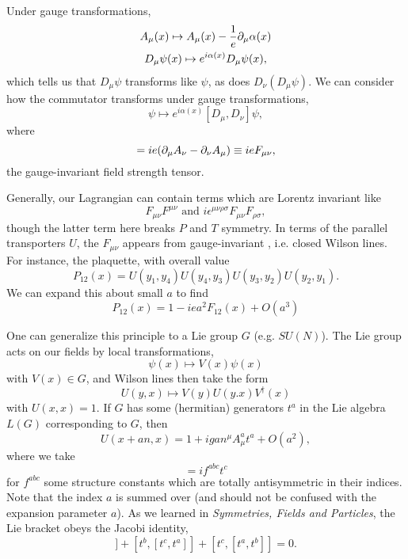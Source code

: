 Under gauge transformations,
\begin{gather}
    A_\mu(x) \mapsto A_\mu(x) -\frac{1}{e} \partial_\mu \alpha(x)\\
    D_\mu \psi(x) \mapsto e^{i\alpha(x)}D_\mu \psi(x),
\end{gather}
which tells us that $D_\mu \psi$ transforms like $\psi$, as does $D_\nu (D_\mu \psi)$. We can consider how the commutator transforms under gauge transformations,
\begin{equation}
    [D_\mu,D_\nu]\psi \mapsto e^{i\alpha(x)} [D_\mu,D_\nu] \psi,
\end{equation}
where
\begin{equation}
    [D_\mu,D_\nu]=ie(\p_\mu A_\nu - \p_\nu A_\mu)\equiv ie F_{\mu\nu},
\end{equation}
the gauge-invariant field strength tensor.

Generally, our Lagrangian can contain terms which are Lorentz invariant like
\begin{equation}
    F_{\mu\nu} F^{\mu\nu}\text{ and } i\epsilon^{\mu\nu\rho\sigma} F_{\mu\nu} F_{\rho\sigma},
\end{equation}
though the latter term here breaks $P$ and $T$ symmetry. In terms of the parallel transporters $U$, the $F_{\mu\nu}$ appears from gauge-invariant , i.e. closed Wilson lines. For instance, the plaquette, with overall value
\begin{equation}
    P_{12}(x)=U(y_1,y_4)U(y_4,y_3) U(y_3,y_2) U(y_2,y_1).
\end{equation}
We can expand this about small $a$ to find
\begin{equation}
    P_{12}(x)=1-iea^2 F_{12}(x)+ O(a^3)
\end{equation}

One can generalize this principle to a Lie group $G$ (e.g. $SU(N)$). The Lie group acts on our fields by local transformations,
\begin{equation}
    \psi(x) \mapsto V(x) \psi(x)
\end{equation}
with $V(x)\in G$, and Wilson lines then take the form
\begin{equation}
    U(y,x)\mapsto V(y) U(y.x) V^\dagger (x)
\end{equation}
with $U(x,x)=1$. If $G$ has some (hermitian) generators $t^a$ in the Lie algebra $L(G)$ corresponding to $G$, then
\begin{equation}
    U(x+an,x)=1+ig a n^\mu A_\mu^a t^a+O(a^2),
\end{equation}
where we take
\begin{equation}
    [t^a,t^b] = if^{abc}t^c
\end{equation}
for $f^{abc}$ some structure constants which are totally antisymmetric in their indices. Note that the index $a$ is summed over (and should not be confused with the expansion parameter $a$). As we learned in \emph{Symmetries, Fields and Particles}, the Lie bracket obeys the Jacobi identity,
\begin{equation*}
    [t^a,[t^b,t^c]]+[t^b,[t^c,t^a]] +[t^c,[t^a,t^b]]=0.
\end{equation*}

